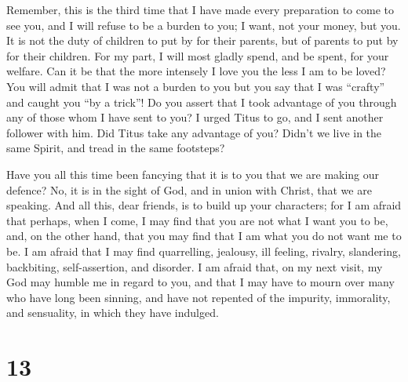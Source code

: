  Remember, this is the third time that I have made every
preparation to come to see you, and I will refuse to be a burden to you;
I want, not your money, but you. It is not the duty of children to put
by for their parents, but of parents to put by for their children.
 For my part, I will most gladly spend, and be spent, for
your welfare. Can it be that the more intensely I love you the less I am
to be loved?  You will admit that I was not a burden to you
but you say that I was ``crafty'' and caught you ``by a trick''!
 Do you assert that I took advantage of you through any of
those whom I have sent to you?  I urged Titus to go, and I
sent another follower with him. Did Titus take any advantage of you?
Didn't we live in the same Spirit, and tread in the same footsteps?

 Have you all this time been fancying that it is to you
that we are making our defence? No, it is in the sight of God, and in
union with Christ, that we are speaking. And all this, dear friends, is
to build up your characters;  for I am afraid that perhaps,
when I come, I may find that you are not what I want you to be, and, on
the other hand, that you may find that I am what you do not want me to
be. I am afraid that I may find quarrelling, jealousy, ill feeling,
rivalry, slandering, backbiting, self-assertion, and disorder.
 I am afraid that, on my next visit, my God may humble me
in regard to you, and that I may have to mourn over many who have long
been sinning, and have not repented of the impurity, immorality, and
sensuality, in which they have indulged.

\hypertarget{section-11}{%
\section{13}\label{section-11}}

